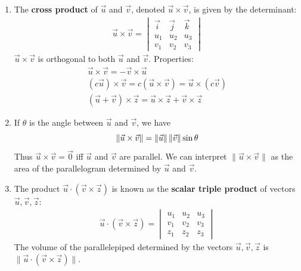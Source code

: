 \documentclass[10pt]{article}
\begin{document}
\begin{multicols}{2}
\begin{enumerate}
\begin{enumerate}
    \item The \textbf{cross product} of $\vec{u}$ and $\vec{v}$, denoted $\vec{u} \times \vec{v}$, is given by the determinant:
    \begin{align*}
        \vec{u} \times \vec{v} = 
        \begin{vmatrix}
        \vec{i} & \vec{j} & \vec{k} \\
        u_1 & u_2 & u_3 \\
        v_1 & v_2 & v_3 
        \end{vmatrix}
    \end{align*}
    $\vec{u} \times \vec{v}$ is orthogonal to both $\vec{u}$ and $\vec{v}$. Properties:
    \begin{align*}
        \vec{u} \times \vec{v} = -\vec{v} \times \vec{u} \\
        (c\vec{u}) \times \vec{v} = c(\vec{u} \times \vec{v}) = \vec{u} \times (c\vec{v}) \\
        (\vec{u} + \vec{v}) \times \vec{z} = \vec{u} \times \vec{z} + \vec{v} \times \vec{z}
    \end{align*}
    \item If $\theta$ is the angle between $\vec{u}$ and $\vec{v}$, we have
    \begin{equation*}
        \| \vec{u} \times \vec{v} \| = \| \vec{u} \| \hspace{.5mm} \| \vec{v} \| \sin{\theta}
    \end{equation*}
    Thus $\vec{u} \times \vec{v} = \vec{0}$ iff $\vec{u}$ and $\vec{v}$ are parallel. We can interpret $\| \vec{u} \times \vec{v} \|$ as the area of the parallelogram determined by $\vec{u}$ and $\vec{v}$.
    \item The product $\vec{u} \cdot (\vec{v} \times \vec{z})$ is known as the \textbf{scalar triple product} of vectors $\vec{u}, \vec{v}, \vec{z}$:
    \begin{align*}
        \vec{u} \cdot (\vec{v} \times \vec{z}) = 
        \begin{vmatrix}
        u_1 & u_2 & u_3 \\
        v_1 & v_2 & v_3 \\
        z_1 & z_2 & z_3
        \end{vmatrix}
    \end{align*}
    The volume of the parallelepiped determined by the vectors $\vec{u}, \vec{v}, \vec{z}$ is $\| \vec{u} \cdot (\vec{v} \times \vec{z}) \|$.
    \end{enumerate}


\end{enumerate}
\end{multicols}
\end{document}
